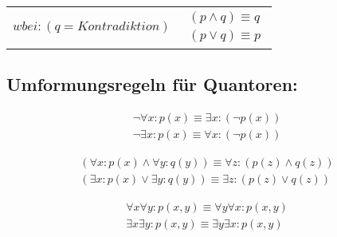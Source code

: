 \begin{framed} [Kontradiktionsregeln] 
  \begin{center}
    \vspace{-.3cm}
    \begin{tabular} {c c}
      \parbox{.5\textwidth}{\begin{equation*}
        wbei: (q = Kontradiktion) 
      \end{equation*}}
      &
      \parbox{3cm}{\begin{equation*}
        \begin{aligned}
          (p \wedge q) \equiv q \\ 
          (p \vee q) \equiv p 
        \end{aligned}
      \end{equation*}}
    \end{tabular}
    \vspace{-.3cm}
  \end{center}
\end{framed}
\vspace{-.7cm}

\subsection*{Umformungsregeln für Quantoren:}
\begin{framed} [Negationsregeln]
  \begin{equation*}
    \begin{aligned}
      \neg \forall x : p(x) \equiv \exists x : (\neg p(x)) \\
      \neg \exists x : p(x) \equiv \forall x : (\neg p(x))	
    \end{aligned}
  \end{equation*}
\end{framed}

\vspace{-.7cm}

\begin{framed} [Ausklammerregeln]
  \begin{equation*}
    \begin{aligned}
      (\forall x : p(x) \wedge \forall y : q(y)) \equiv \forall z : (p(z) \wedge q(z)) \\
      (\exists x : p(x) \vee \exists y : q(y)) \equiv \exists z : (p(z) \vee q(z))
    \end{aligned}
  \end{equation*}
\end{framed}

\vspace{-.7cm}

\begin{framed} [Vertauschungsregeln]
  \begin{equation*}
    \begin{aligned}
      \forall x \forall y : p(x,y) \equiv \forall y \forall x : p(x,y)\\
      \exists x \exists y : p(x,y) \equiv \exists y \exists x : p(x,y)
    \end{aligned}
  \end{equation*}
\end{framed}


